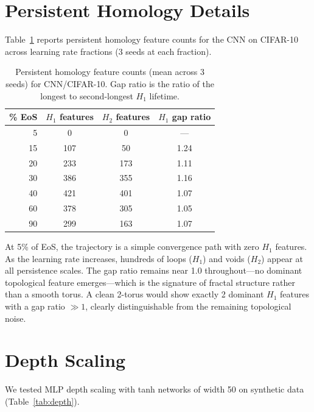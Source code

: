 \documentclass[aps,prl,twocolumn,superscriptaddress]{revtex4-2}
\begin{document}
\section{Persistent Homology Details}

Table~\ref{tab:tda} reports persistent homology feature counts for the CNN on CIFAR-10 across learning rate fractions (3 seeds at each fraction).

\begin{table}[h]
\caption{\label{tab:tda}%
Persistent homology feature counts (mean across 3 seeds) for CNN/CIFAR-10. Gap ratio is the ratio of the longest to second-longest $H_1$ lifetime.}
\begin{ruledtabular}
\begin{tabular}{rccc}
\% EoS & $H_1$ features & $H_2$ features & $H_1$ gap ratio\\
\hline
5 & 0 & 0 & ---\\
15 & 107 & 50 & 1.24\\
20 & 233 & 173 & 1.11\\
30 & 386 & 355 & 1.16\\
40 & 421 & 401 & 1.07\\
60 & 378 & 305 & 1.05\\
90 & 299 & 163 & 1.07\\
\end{tabular}
\end{ruledtabular}
\end{table}

At 5\% of EoS, the trajectory is a simple convergence path with zero $H_1$ features. As the learning rate increases, hundreds of loops ($H_1$) and voids ($H_2$) appear at all persistence scales. The gap ratio remains near 1.0 throughout---no dominant topological feature emerges---which is the signature of fractal structure rather than a smooth torus. A clean 2-torus would show exactly 2 dominant $H_1$ features with a gap ratio $\gg 1$, clearly distinguishable from the remaining topological noise.

\section{Depth Scaling}

We tested MLP depth scaling with tanh networks of width 50 on synthetic data (Table~\ref{tab:depth}).
\end{document}
